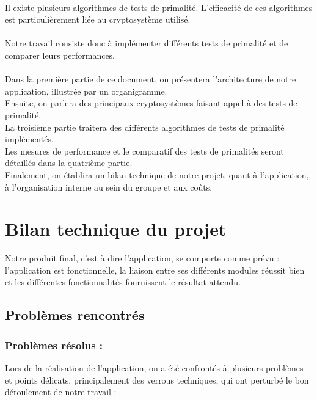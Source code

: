 	\paragraph{}Il existe plusieurs algorithmes de tests de primalité. L'efficacité de ces algorithmes est particulièrement liée au cryptosystème utilisé. 
	\paragraph{}Notre travail consiste donc à implémenter différents tests de primalité et de comparer leurs performances.
	\paragraph{}Dans la première partie de ce document, on présentera l'architecture de notre application, illustrée par un organigramme.\\
	Ensuite, on parlera des principaux cryptosystèmes faisant appel à des tests de primalité. \\
	La troisième partie traitera des différents algorithmes de tests de primalité implémentés.\\
	Les mesures de performance et le comparatif des tests de primalités seront détaillés dans la quatrième partie.\\
	Finalement, on établira un bilan technique de notre projet, quant à l'application, à l'organisation interne au sein du groupe et aux coûts.
	
	
	
	
	
	
	
	
	
	
	
	
	
	\section{Bilan technique du projet}
		Notre produit final, c'est à dire l'application, se comporte comme prévu : l'application est fonctionnelle, la liaison entre ses différents modules réussit bien et les différentes fonctionnalités fournissent le résultat attendu.		

		\subsection{Problèmes rencontrés}
			\subsubsection*{Problèmes résolus :} 
			Lors de la réalisation de l'application, on a été confrontés à plusieurs problèmes et points délicats, principalement des verrous techniques, qui ont perturbé le bon déroulement de notre travail :
				
